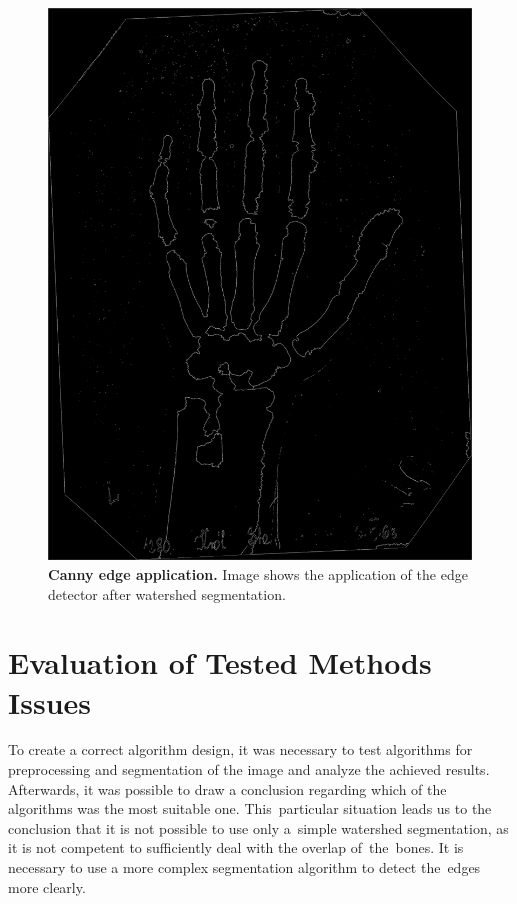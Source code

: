 \begin{figure}[!ht]
    \centering
    \includegraphics[width=.5\textwidth]{obrazky-figures/water_canny.pdf}
    \caption{\textbf{Canny edge application.} Image shows the application of the edge detector after watershed segmentation.}
    \label{water-canny}
\end{figure}


\section{Evaluation of Tested Methods Issues}
To create a correct algorithm design, it was necessary to test algorithms for preprocessing and segmentation of the image and analyze the achieved results. Afterwards, it was possible to draw a conclusion regarding which of the algorithms was the most suitable one. This~particular situation leads us to the conclusion that it is not possible to use only a~simple watershed segmentation, as it is not competent to sufficiently deal with the overlap of~the~bones. It is necessary to use a more complex segmentation algorithm to detect the~edges more clearly.

